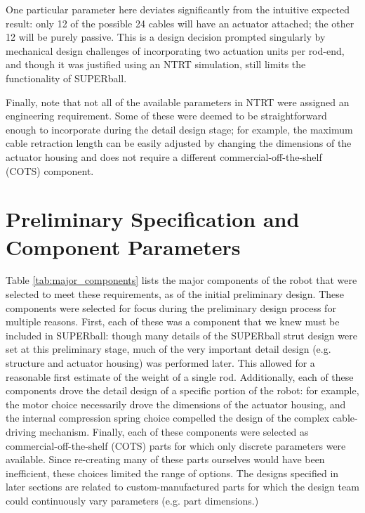 \documentclass[12pt]{report}
\begin{document}
One particular parameter here deviates significantly from the intuitive expected result: only 12 of the possible 24 cables will have an actuator attached; the other 12 will be purely passive.
This is a design decision prompted singularly by mechanical design challenges of incorporating two actuation units per rod-end, and though it was justified using an NTRT simulation, still limits the functionality of SUPERball.

Finally, note that not all of the available parameters in NTRT were assigned an engineering requirement.
Some of these were deemed to be straightforward enough to incorporate during the detail design stage; for example, the maximum cable retraction length can be easily adjusted by changing the dimensions of the actuator housing and does not require a different commercial-off-the-shelf (COTS) component.



\section{Preliminary Specification and Component Parameters}

Table \ref{tab:major_components} lists the major components of the robot that were selected to meet these requirements, as of the initial preliminary design.
These components were selected for focus during the preliminary design process for multiple reasons.
First, each of these was a component that we knew must be included in SUPERball: though many details of the SUPERball strut design were set at this preliminary stage, much of the very important detail design (e.g. structure and actuator housing) was performed later.
This allowed for a reasonable first estimate of the weight of a single rod.
Additionally, each of these components drove the detail design of a specific portion of the robot: for example, the motor choice necessarily drove the dimensions of the actuator housing, and the internal compression spring choice compelled the design of the complex cable-driving mechanism.
Finally, each of these components were selected as commercial-off-the-shelf (COTS) parts for which only discrete parameters were available.
Since re-creating many of these parts ourselves would have been inefficient, these choices limited the range of options.
The designs specified in later sections are related to custom-manufactured parts for which the design team could continuously vary parameters (e.g. part dimensions.)
\end{document}
